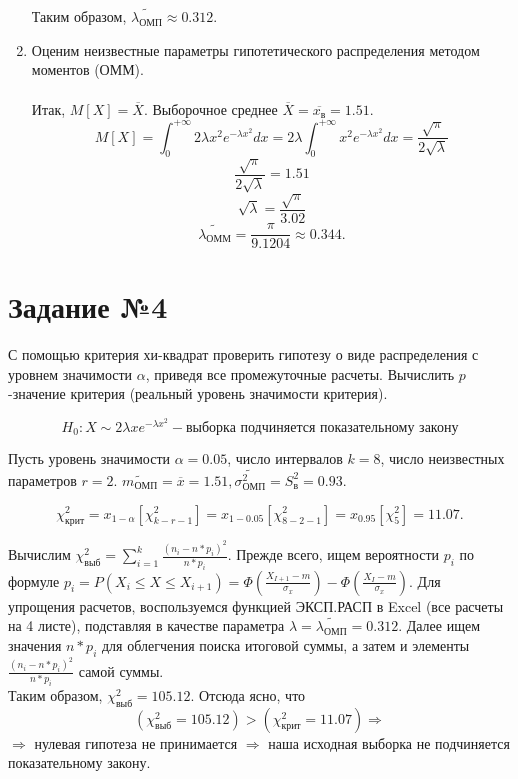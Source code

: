 \documentclass[12pt, letterpaper, twoside]{article}
\begin{document}
\begin{enumerate}
	Таким образом, $\widetilde{\lambda_{\text{ОМП}}} \approx 0.312$.

	\item Оценим неизвестные параметры гипотетического распределения методом моментов (ОММ).\\ \\
	Итак, $M[X] = \overline{X}$. Выборочное среднее $\overline{X} = \overline{x_{\text{в}}} = 1.51$.\\
	$$M[X] = \int_0^{+\infty} 2\lambda x^2 e^{-\lambda x^2}dx = 2\lambda \int_0^{+\infty} x^2 e^{-\lambda x^2}dx = \frac{\sqrt{\pi}}{2\sqrt{\lambda}}$$
	$$\frac{\sqrt{\pi}}{2\sqrt{\lambda}} = 1.51$$
	$$\sqrt{\lambda} = \frac{\sqrt{\pi}}{3.02}$$
	$$\widetilde{\lambda_{\text{ОММ}}} = \frac{\pi}{9.1204} \approx 0.344.$$
\end{enumerate} 

\section{Задание №4}

С помощью критерия хи-квадрат проверить гипотезу о виде распределения с уровнем значимости $\alpha$, приведя все промежуточные расчеты. Вычислить $p$-значение критерия (реальный уровень значимости критерия).

$$H_0: X \sim 2\lambda xe^{-\lambda x^2} - \text{выборка подчиняется показательному закону}$$

Пусть уровень значимости $\alpha = 0.05$, число интервалов $k = 8$, число неизвестных параметров $r = 2$. $\widetilde{m_{\text{ОМП}}} = \overline{x} = 1.51, \widetilde{\sigma_{\text{ОМП}}^2} = S_{\text{в}}^2 = 0.93$.

$$\chi_{\text{крит}}^2 = x_{1-\alpha}[\chi_{k-r-1}^2] = x_{1-0.05}[\chi_{8-2-1}^2] = x_{0.95}[\chi_{5}^2] = 11.07.$$

Вычислим $\chi_{\text{выб}}^2 = \sum_{i=1}^k\frac{(n_i-n*p_i)^2}{n*p_i}$. Прежде всего, ищем вероятности $p_i$ по формуле $p_i = P(X_i \leqslant X \leqslant X_{i+1}) = \Phi(\frac{X_{I+1}-m}{\sigma_x}) - \Phi(\frac{X_I-m}{\sigma_x})$. Для упрощения расчетов, воспользуемся функцией ЭКСП.РАСП в Excel (все расчеты на 4 листе), подставляя в качестве параметра $\lambda = \widetilde{\lambda_{\text{ОМП}}} = 0.312$. Далее ищем значения $n*p_i$ для облегчения поиска итоговой суммы, а затем и элементы $\frac{(n_i-n*p_i)^2}{n*p_i}$ самой суммы. \\ 

Таким образом, $\chi_{\text{выб}}^2 = 105.12$. Отсюда ясно, что $$(\chi_{\text{выб}}^2 = 105.12) > (\chi_{\text{крит}}^2 = 11.07) \Rightarrow$$ $\Rightarrow$ нулевая гипотеза не принимается $\Rightarrow$ наша исходная выборка не подчиняется показательному закону.\\
\end{document}
